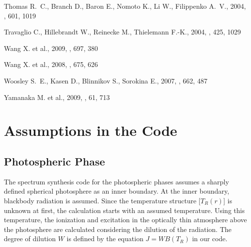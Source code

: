 \documentclass[usegraphicx,usenatbib]{mn2e}
\begin{document}
\begin{thebibliography}{99}
{Thomas} R.~C., {Branch} D., {Baron} E., {Nomoto} K., {Li} W., {Filippenko}
  A.~V., 2004, \apj, 601, 1019

{Travaglio} C., {Hillebrandt} W., {Reinecke} M., {Thielemann} F.-K., 2004,
  \aap, 425, 1029

{Wang} X. et al., 2009, \apj, 697, 380

{Wang} X. et al., 2008,
  \apj, 675, 626

{Woosley} S.~E., {Kasen} D., {Blinnikov} S., {Sorokina} E., 2007, \apj, 662,
  487

{Yamanaka} M. et al., 2009, \pasj,
  61, 713

\end{thebibliography}



\appendix

\section{Assumptions in the Code}


\subsection{Photospheric Phase}
\label{app:early}

The spectrum synthesis code for the photospheric phases assumes a sharply
defined spherical photosphere as an inner boundary. At the inner boundary,
blackbody radiation is assumed. Since the temperature structure [$T_R (r)$] is
unknown at first, the calculation starts with an assumed temperature. Using this
temperature, the ionization and excitation in the optically thin atmosphere
above the photosphere are calculated considering the dilution of the radiation.
The degree of dilution $W$ is defined by the equation  $J = WB(T_R)$ in our
code.
\end{document}
